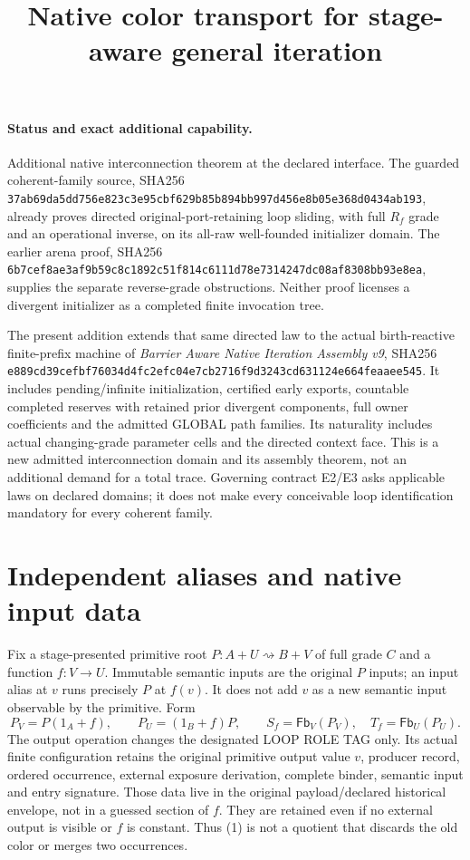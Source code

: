 \documentclass[11pt]{article}
\title{Native color transport for stage-aware general iteration}
\begin{document}
\maketitle
\paragraph{Status and exact additional capability.}
Additional native interconnection theorem at the declared interface. The guarded coherent-family source, SHA256 \texttt{37ab69da5dd756e823c3e95cbf629b85b894bb997d456e8b05e368d0434ab193}, already proves directed original-port-retaining loop sliding, with full $R_f$ grade and an operational inverse, on its all-raw well-founded initializer domain. The earlier arena proof, SHA256 \texttt{6b7cef8ae3af9b59c8c1892c51f814c6111d78e7314247dc08af8308bb93e8ea}, supplies the separate reverse-grade obstructions. Neither proof licenses a divergent initializer as a completed finite invocation tree.

The present addition extends that same directed law to the actual birth-reactive finite-prefix machine of \emph{Barrier Aware Native Iteration Assembly v9}, SHA256 \texttt{e889cd39cefbf76034d4fc2efc04e7cb2716f9d3243cd631124e664feaaee545}. It includes pending/infinite initialization, certified early exports, countable completed reserves with retained prior divergent components, full owner coefficients and the admitted GLOBAL path families. Its naturality includes actual changing-grade parameter cells and the directed context face. This is a new admitted interconnection domain and its assembly theorem, not an additional demand for a total trace. Governing contract E2/E3 asks applicable laws on declared domains; it does not make every conceivable loop identification mandatory for every coherent family.

\section{Independent aliases and native input data}
Fix a stage-presented primitive root $P:A+U\rightsquigarrow B+V$ of full grade $C$ and a function $f:V\to U$. Immutable semantic inputs are the original $P$ inputs; an input alias at $v$ runs precisely $P$ at $f(v)$. It does not add $v$ as a new semantic input observable by the primitive. Form
\[
 P_V=P(1_A+f),\qquad P_U=(1_B+f)P,
 \qquad S_f=\mathsf{Fb}_V(P_V),\quad T_f=\mathsf{Fb}_U(P_U).
 \tag{1}
\]
The output operation changes the designated LOOP ROLE TAG only. Its actual finite configuration retains the original primitive output value $v$, producer record, ordered occurrence, external exposure derivation, complete binder, semantic input and entry signature. Those data live in the original payload/declared historical envelope, not in a guessed section of $f$. They are retained even if no external output is visible or $f$ is constant. Thus (1) is not a quotient that discards the old color or merges two occurrences.
\end{document}
